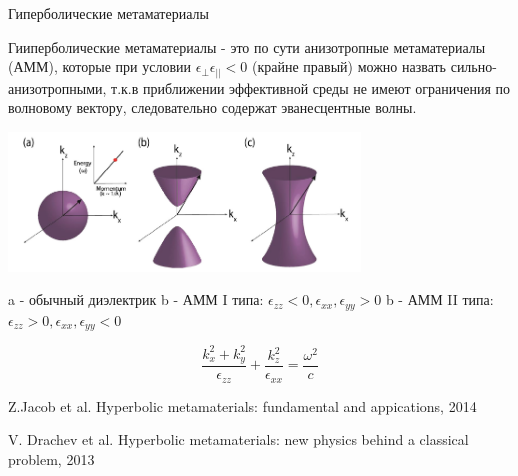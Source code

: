 \documentclass[9pt, compress, xcolor=table]{beamer}
\begin{document}
\begin{frame}{Гиперболические метаматериалы}

Гииперболические метаматериалы - это по сути анизотропные метаматериалы (АММ), которые при условии $\epsilon_{\perp}\epsilon_{||}<0$ (крайне правый) можно назвать сильно-анизотропными, т.к.в приближении эффективной среды не имеют ограничения по волновому вектору, следовательно содержат эванесцентные волны.
\begin{center}
\includegraphics[width=0.7\textwidth]{neg_ref_n5}

{\scriptsize a - обычный диэлектрик
b - АММ I типа: $\epsilon_{zz}<0, \epsilon_{xx},\epsilon_{yy}>0$
b - АММ II типа: $\epsilon_{zz}>0, \epsilon_{xx},\epsilon_{yy}<0$}
\end{center}
\begin{equation*}
\frac{k_x^2+k_y^2}{\epsilon_{zz}}+\frac{k_z^2}{\epsilon_{xx}}=\frac{\omega^2}{c}
\end{equation*}

{\scriptsize Z.Jacob et al. Hyperbolic metamaterials: fundamental and appications, 2014

V. Drachev et al. Hyperbolic metamaterials: new physics behind a classical problem, 2013}
\end{frame}
\end{document}
